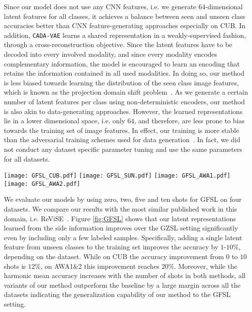 \documentclass[10pt,twocolumn,letterpaper]{article}
\newcommand{\myparagraph}[1]{\vspace{6pt}\noindent{\bf #1}}
\begin{document}
Since our model does not use any CNN features, i.e. we generate $64$-dimensional latent features for all classes, it achieves a balance between seen and unseen class accuracies better than CNN feature-generating approaches especially on CUB.
In addition, \texttt{CADA-VAE} learns
a shared representation in a weakly-supervised fashion, through a cross-reconstruction objective. Since the latent features have to be decoded into every involved modality, and since every modality encodes complementary information, the model is encouraged to learn an encoding that retains the information contained in all used modalities. In doing so, our method is less biased towards learning the distribution of the seen class image features, which is known as the projection domain shift problem~\cite{fu2014transductive}. As we generate a certain number of latent features per class using non-deterministic encoders, our method is also akin to data-generating approaches. However, the learned representations lie in a lower dimensional space, i.e. only $64$, and therefore, are less prone to bias towards the training set of image features. 
In effect, our training is more stable than the adversarial training schemes used for data generation~\cite{featgen}. In fact, we did not conduct any dataset specific parameter tuning and use the same parameters for all datasets.

\begin{figure*}[t]
    \texttt{[image: GFSL\_CUB.pdf]}
    \texttt{[image: GFSL\_SUN.pdf]}
    \texttt{[image: GFSL\_AWA1.pdf]}
    \texttt{[image: GFSL\_AWA2.pdf]}
    \vspace{-3mm}
\caption{Comparing \texttt{CA-VAE}, \texttt{DA-VAE}, \texttt{CADA-VAE} with ReViSE \cite{tsai2017improving} with increasing numbers of training samples from unseen classes, i.e. in the generalized few-shot setting.}
\label{fig:GFSL}
\end{figure*}

\myparagraph{Generalized Few-Shot Learning.}
We evaluate our models by using zero, two, five and ten shots for GFSL on four datasets. We compare our results with the most similar published work in this domain, i.e. ReViSE~\cite{tsai2017improving}. 
Figure \ref{fig:GFSL} shows that our latent representations learned from the side information improves over the GZSL setting significantly even by including only a few labeled samples. Specifically, adding a single latent feature from unseen classes to the training set improves the accuracy by $1$-$10\%$, depending on the dataset. While on CUB the accuracy improvement from $0$ to $10$ shots is $12\%$, on AWA1\&2 this improvement reaches $20\%$. Moreover, while the harmonic mean accuracy increases with the number of shots in both methods, all variants of our method outperform the baseline by a large margin across all the datasets indicating the generalization capability of our method to the GFSL setting.
\end{document}
